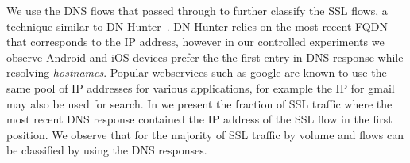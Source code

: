 

We use the DNS flows that passed through \platname to further classify the SSL flows, a technique similar to DN-Hunter~\cite{bermudez:dnhunter}.
DN-Hunter relies on the most recent FQDN that corresponds to the IP address, however in our controlled experiments we observe Android and iOS devices prefer the the first entry in DNS response while resolving \emph{hostnames}.
Popular webservices such as google are known to use the same pool of IP addresses for various applications, for example the IP for gmail may also be used for search. 
In  we present the fraction of SSL traffic where the most recent DNS response contained the IP address of the SSL flow in the first position. 
We observe that for the majority of SSL traffic by volume and flows can be classified by using the DNS responses. 

